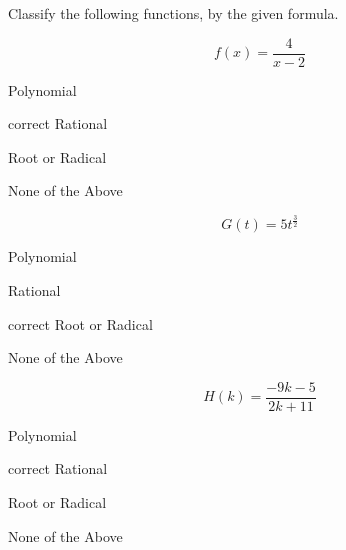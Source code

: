 \documentclass{ximera}
\author{Lee Wayand}
\begin{document}
\begin{exercise}




Classify the following functions, by the given formula.



\begin{question}


\[
f(x) = \frac{4}{x-2}
\]

\begin{multipleChoice}
\item {Polynomial}
\item [correct]{Rational}
\item {Root or Radical}
\item {None of the Above}
\end{multipleChoice}


\end{question}











\begin{question}


\[
G(t) = 5 t^{\tfrac{3}{2}}
\]

\begin{multipleChoice}
\item {Polynomial}
\item {Rational}
\item [correct]{Root or Radical}
\item {None of the Above}
\end{multipleChoice}


\end{question}







\begin{question}


\[
H(k) = \frac{-9k - 5}{2k + 11}
\]

\begin{multipleChoice}
\item {Polynomial}
\item [correct]{Rational}
\item {Root or Radical}
\item {None of the Above}
\end{multipleChoice}


\end{question}












\end{exercise}
\end{document}
